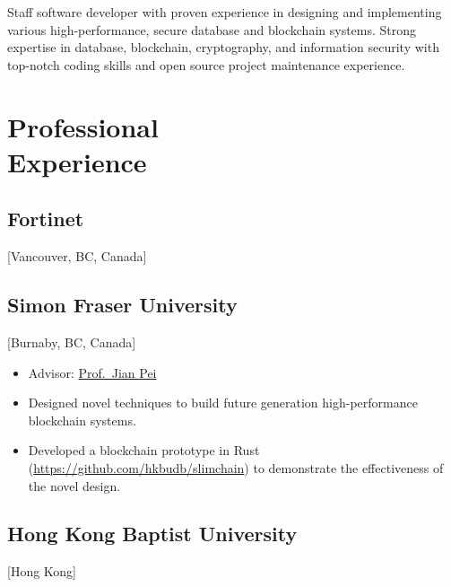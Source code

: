 \documentclass{mycv}
\begin{document}
\maketitle%

\begin{summary}
Staff software developer with proven experience in designing and implementing various high-performance, secure database and blockchain systems. Strong expertise in database, blockchain, cryptography, and information security with top-notch coding skills and open source project maintenance experience.
\end{summary}

\section{Professional \\ Experience}

\subsection{Fortinet}[Vancouver, BC, Canada]
\begin{positions}
\end{positions}

\subsection{Simon Fraser University}[Burnaby, BC, Canada]
\begin{positions}
\end{positions}

\begin{itemize}
  \item Advisor: \href{https://sites.google.com/view/jpei/jian-peis-homepage}{Prof.~Jian Pei}
  \item Designed novel techniques to build future generation high-performance blockchain systems.
  \item Developed a blockchain prototype in Rust (\url{https://github.com/hkbudb/slimchain}) to demonstrate the effectiveness of the novel design.
\end{itemize}

\subsection{Hong Kong Baptist University}[Hong Kong]
\begin{positions}
\end{positions}
\end{document}
